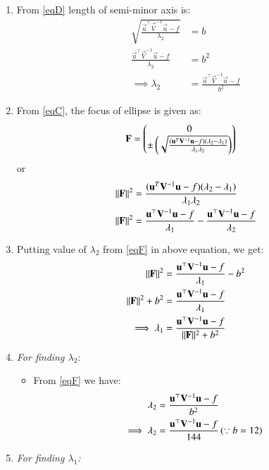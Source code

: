 \documentclass[journal,12pt,twocolumn]{IEEEtran}
\begin{document}
\begin{enumerate}
\item From \eqref{eqD} length of semi-minor axis is:
\begin{align}
 \sqrt{\frac{\vec{u}^{\top}\vec{V}^{-1}\vec{u}-f}{\lambda_2}} &= b
\\
 \frac{\vec{u}^{\top}\vec{V}^{-1}\vec{u}-f}{\lambda_2} &= b^2
\\
\implies \lambda_2&=\frac{\vec{u}^{\top}\vec{V}^{-1}\vec{u}-f}{b^2}\label{eqF} 
\end{align}
\item From \eqref{eqC}, the focus of ellipse is given as:
\begin{align}
 \mathbf{F} &= \begin{pmatrix}0\\\pm \left(\sqrt{\frac{(\mathbf{u}^T\mathbf{V}^{-1}\mathbf{u}-f)(\lambda_2-\lambda_1)}{\lambda_1\lambda_2}}\right)\end{pmatrix}
 \end{align}
 or
 \begin{align}
\lVert\mathbf{F}\rVert^2 &= \frac{(\mathbf{u}^T\mathbf{V}^{-1}\mathbf{u}-f)(\lambda_2-\lambda_1)}{\lambda_1\lambda_2}
 \\
\lVert\mathbf{F}\rVert^2 &= \frac{\mathbf{u}^{\top}\mathbf{V}^{-1}\mathbf{u}-f}{\lambda_1}-\frac{\mathbf{u}^{\top}\mathbf{V}^{-1}\mathbf{u}-f}{\lambda_2} \label{eqE}
 \end{align}
\item Putting value of $\lambda_2$ from \eqref{eqF} in above equation, we get:
\begin{align}
    \lVert\mathbf{F}\rVert^2&= \frac{\mathbf{u}^{\top}\mathbf{V}^{-1}\mathbf{u}-f}{\lambda_1}-b^2
    \\
    \lVert\mathbf{F}\rVert^2+b^2 &= \frac{\mathbf{u}^{\top}\mathbf{V}^{-1}\mathbf{u}-f}{\lambda_1}
    \\
 \implies \lambda_1 &= \frac{\mathbf{u}^{\top}\mathbf{V}^{-1}\mathbf{u}-f}{\lVert\mathbf{F}\rVert^2+b^2}\label{eq1}
    \end{align}
    \item \textit{For finding $\lambda_2$}:
\begin{itemize}
    \item From \eqref{eqF} we have:
\begin{align}
\lambda_2&=\frac{\mathbf{u}^{\top}\mathbf{V}^{-1}\mathbf{u}-f}{b^2}
\\
\implies \lambda_2&=\frac{\mathbf{u}^{\top}\mathbf{V}^{-1}\mathbf{u}-f}{144} \left(\because b=12\right) \label{eqH}
\end{align}
\end{itemize}
\item \textit{For finding $\lambda_1$:}
\begin{itemize}

\end{itemize}
\end{enumerate}
\end{document}
